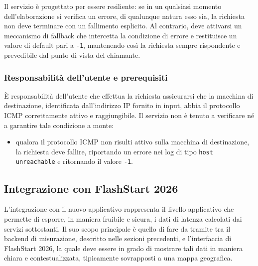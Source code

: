 Il servizio è progettato per essere resiliente: se in un qualsiasi momento dell'elaborazione si verifica un errore, di qualunque natura esso sia, la richiesta non deve terminare con un fallimento esplicito. Al contrario, deve attivarsi un meccanismo di fallback che intercetta la condizione di errore e restituisce un valore di default pari a \texttt{-1}, mantenendo così la richiesta sempre rispondente e prevedibile dal punto di vista del chiamante.

\subsubsection{Responsabilità dell'utente e prerequisiti}
È responsabilità dell'utente che effettua la richiesta assicurarsi che la macchina di destinazione, identificata dall'indirizzo \ac{IP} fornito in input, abbia il protocollo \ac{ICMP} correttamente attivo e raggiungibile. Il servizio non è tenuto a verificare né a garantire tale condizione a monte:
\begin{itemize}
    \item qualora il protocollo \ac{ICMP} non risulti attivo sulla macchina di destinazione, la richiesta deve fallire, riportando un errore nei log di tipo \texttt{host unreachable} e ritornando il valore \texttt{-1}.
\end{itemize}

\subsection{Integrazione con FlashStart 2026}

L'integrazione con il nuovo applicativo rappresenta il livello applicativo che permette di esporre, in maniera fruibile e sicura, i dati di latenza calcolati dai servizi sottostanti. Il suo scopo principale è quello di fare da tramite tra il backend di misurazione, descritto nelle sezioni precedenti, e l'interfaccia di FlashStart 2026, la quale deve essere in grado di mostrare tali dati in maniera chiara e contestualizzata, tipicamente sovrapposti a una mappa geografica.


